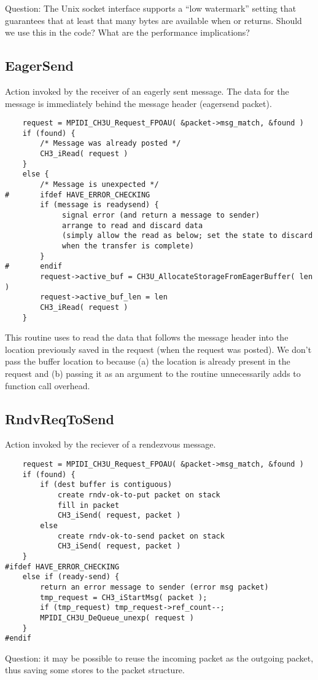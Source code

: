 \documentclass{article}
\begin{document}
Question: The Unix socket interface supports a ``low watermark''
setting that guarantees that at least that many bytes are available
when  or  returns.  Should we use this in the
code?  What are the performance implications?

\subsection{EagerSend}
Action invoked by the receiver of an eagerly sent message.  The data for the
message is immediately behind the message header (eagersend packet).
\begin{verbatim}
    request = MPIDI_CH3U_Request_FPOAU( &packet->msg_match, &found )
    if (found) {
        /* Message was already posted */
        CH3_iRead( request )
    }
    else {
        /* Message is unexpected */
#       ifdef HAVE_ERROR_CHECKING
        if (message is readysend) {
             signal error (and return a message to sender)
             arrange to read and discard data 
             (simply allow the read as below; set the state to discard
             when the transfer is complete)
        }
#       endif
        request->active_buf = CH3U_AllocateStorageFromEagerBuffer( len )
        request->active_buf_len = len
        CH3_iRead( request )
    }
\end{verbatim}
This routine uses  to read the data that follows the
message header into the location previously saved in the request (when
the request was posted).  We don't pass the buffer location to
 because (a) the location is already present in the
request and (b) passing it as an argument to the routine unnecessarily
adds to function call overhead.


\subsection{RndvReqToSend}
Action invoked by the reciever of a rendezvous message.
\begin{verbatim}
    request = MPIDI_CH3U_Request_FPOAU( &packet->msg_match, &found )
    if (found) {
        if (dest buffer is contiguous)
            create rndv-ok-to-put packet on stack
            fill in packet
            CH3_iSend( request, packet )
        else
            create rndv-ok-to-send packet on stack
            CH3_iSend( request, packet )
    }
#ifdef HAVE_ERROR_CHECKING
    else if (ready-send) {
        return an error message to sender (error msg packet)
        tmp_request = CH3_iStartMsg( packet );
        if (tmp_request) tmp_request->ref_count--;
        MPIDI_CH3U_DeQueue_unexp( request )
    }
#endif
\end{verbatim}
Question: it may be possible to reuse the incoming packet as the
outgoing packet, thus saving some stores to the packet structure.
\end{document}
